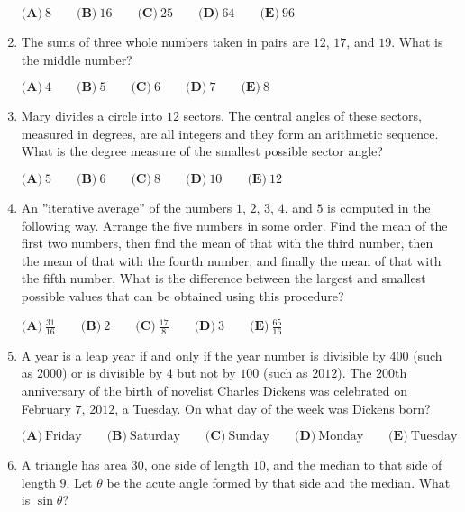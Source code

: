 \documentclass{article}
\begin{document}
\begin{enumerate}[label=\arabic*., itemsep=0.5em]
$ \textbf{(A)}\ 8\qquad\textbf{(B)}\ 16\qquad\textbf{(C)}\ 25\qquad\textbf{(D)}\ 64\qquad\textbf{(E)}\ 96 $\par \vspace{0.5em}\item The sums of three whole numbers taken in pairs are $12$, $17$, and $19$.  What is the middle number?

$ \textbf{(A)}\ 4\qquad\textbf{(B)}\ 5\qquad\textbf{(C)}\ 6\qquad\textbf{(D)}\ 7\qquad\textbf{(E)}\ 8 $\par \vspace{0.5em}\item Mary divides a circle into $12$ sectors.  The central angles of these sectors, measured in degrees, are all integers and they form an arithmetic sequence.  What is the degree measure of the smallest possible sector angle?

$ \textbf{(A)}\ 5\qquad\textbf{(B)}\ 6\qquad\textbf{(C)}\ 8\qquad\textbf{(D)}\ 10\qquad\textbf{(E)}\ 12 $\par \vspace{0.5em}\item An ''iterative average'' of the numbers $1$, $2$, $3$, $4$, and $5$ is computed in the following way.  Arrange the five numbers in some order.  Find the mean of the first two numbers, then find the mean of that with the third number, then the mean of that with the fourth number, and finally the mean of that with the fifth number.  What is the difference between the largest and smallest possible values that can be obtained using this procedure?

$ \textbf{(A)}\ \frac{31}{16}\qquad\textbf{(B)}\ 2\qquad\textbf{(C)}\ \frac{17}{8}\qquad\textbf{(D)}\ 3\qquad\textbf{(E)}\ \frac{65}{16} $\par \vspace{0.5em}\item A year is a leap year if and only if the year number is divisible by $400$ (such as $2000$) or is divisible by $4$ but not by $100$ (such as $2012$).  The $200\text{th}$ anniversary of the birth of novelist Charles Dickens was celebrated on February $7$, $2012$, a Tuesday.  On what day of the week was Dickens born?

$ \textbf{(A)}\ \text{Friday}
\qquad\textbf{(B)}\ \text{Saturday}
\qquad\textbf{(C)}\ \text{Sunday}
\qquad\textbf{(D)}\ \text{Monday}
\qquad\textbf{(E)}\ \text{Tuesday}
 $\par \vspace{0.5em}\item A triangle has area $30$, one side of length $10$, and the median to that side of length $9$.  Let $\theta$ be the acute angle formed by that side and the median.  What is $\sin{\theta}$?


\end{enumerate}
\end{document}
